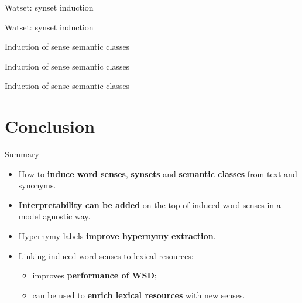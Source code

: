 \documentclass{beamer}
\begin{document}
\begin{frame}{Watset: synset induction}
	
\end{frame}


\begin{frame}{Watset: synset induction}
	
\end{frame}


\begin{frame}{Induction of sense semantic classes}
	
\end{frame}

\begin{frame}{Induction of sense semantic classes}
	
\end{frame}

\begin{frame}{Induction of sense semantic classes}
	
\end{frame}


\section{Conclusion}

\begin{frame}{Summary}

\begin{itemize}
	\item How to \textbf{induce word senses}, \textbf{synsets} and \textbf{semantic classes} from text and synonyms.
    \vspace{1em}
    \pause
    
	\item \textbf{Interpretability can be added} on the top of induced word senses in a model agnostic way. 
	\vspace{1em}
    \pause
	
	\item Hypernymy labels \textbf{improve hypernymy extraction}. 
	\vspace{1em}
	\pause
	
	\item Linking induced word senses to lexical resources:
	\begin{itemize} 
		\item improves \textbf{performance of WSD};
		\item can be used to \textbf{enrich lexical resources} with new senses.
	\end{itemize}
	
	
\end{itemize}


\end{frame}
\end{document}
